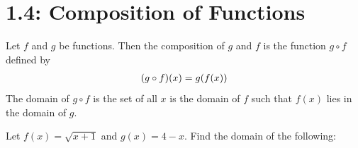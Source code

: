 \documentclass[../mathNotesPreamble]{subfiles}
\providecommand{\relscalefact}{1.4}
\begin{document}
\relscale{\relscalefact}
  \section{1.4: Composition of Functions}

  \begin{defn*}
      Let $f$ and $g$ be functions. Then the composition of $g$ and $f$ is the function $g\circ f$ defined by
      \begin{align*}
        {\left(g\circ f\right)}(x)=g{\left(f(x)\right)}
      \end{align*}
      The domain of $g\circ f$ is the set of all $x$ is the domain of $f$ such that $f(x)$ lies in the domain of $g$.
    \end{defn*}
    
    \begin{ex*}
      Let $f(x)=\sqrt{x+1}$ and $g(x)=4-x$. Find the domain of the following:
    \end{ex*}    
\end{document}
